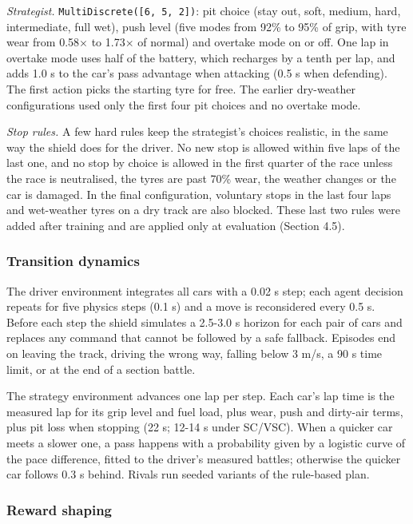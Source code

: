 \documentclass{ieeeaccess}
\begin{document}
\emph{Strategist.} \texttt{MultiDiscrete({[}6,\ 5,\ 2{]})}: pit choice (stay out, soft, medium,
hard, intermediate, full wet), push level (five modes from 92\% to 95\% of grip, with
tyre wear from 0.58\ensuremath{\times} to 1.73\ensuremath{\times} of normal) and overtake mode on or off. One lap in
overtake mode uses half of the battery, which recharges by a tenth per lap, and
adds 1.0 s to the car's pass advantage when attacking (0.5 s when defending). The
first action picks the starting tyre for free. The earlier dry-weather
configurations used only the first four pit choices and no overtake mode.

\emph{Stop rules.} A few hard rules keep the strategist's choices realistic, in the same
way the shield does for the driver. No new stop is allowed within five laps of the
last one, and no stop by choice is allowed in the first quarter of the race unless
the race is neutralised, the tyres are past 70\% wear, the weather changes or the
car is damaged. In the final configuration, voluntary stops in the last four laps
and wet-weather tyres on a dry track are also blocked. These last two rules were
added after training and are applied only at evaluation (Section 4.5).

\subsubsection{Transition dynamics}

The driver environment integrates all cars with a 0.02 s step; each agent decision
repeats for five physics steps (0.1 s) and a move is reconsidered every 0.5 s.
Before each step the shield simulates a 2.5-3.0 s horizon for each pair of cars and
replaces any command that cannot be followed by a safe fallback. Episodes end on
leaving the track, driving the wrong way, falling below 3 m/s, a 90 s time limit, or
at the end of a section battle.

The strategy environment advances one lap per step. Each car's lap time is the
measured lap for its grip level and fuel load, plus wear, push and dirty-air
terms, plus pit loss when stopping (22 s; 12-14 s under SC/VSC). When a quicker car
meets a slower one, a pass happens with a probability given by a logistic curve
of the pace difference, fitted to the driver's measured battles; otherwise the
quicker car follows 0.3 s behind. Rivals run seeded variants of the rule-based
plan.

\subsubsection{Reward shaping}
\end{document}
